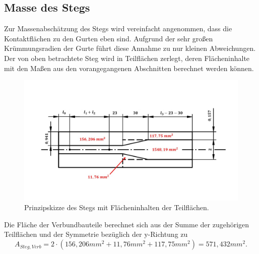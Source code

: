 \subsection{Masse des Stegs}
Zur Massenabschätzung des Stegs wird vereinfacht angenommen, dass die Kontaktflächen zu den Gurten eben sind. Aufgrund der sehr großen Krümmungsradien der Gurte führt diese Annahme zu nur kleinen Abweichungen.  
Der von oben betrachtete Steg wird in Teilflächen zerlegt, deren Flächeninhalte mit den Maßen aus den vorangegangenen Abschnitten berechnet werden können.
\begin{figure}[h]
	\includegraphics[width=1.0\textwidth]{Bilder/Stegflaeche.jpg}
	\caption{Prinzipskizze des Stegs mit Flächeninhalten der Teilflächen.}
	\label{fig: StegFlaeche}
\end{figure}
Die Fläche der Verbundbauteile berechnet sich aus der Summe der zugehörigen Teilflächen und der Symmetrie bezüglich der y-Richtung zu
\begin{equation}
	A_{Steg,Verb}=2\cdot\left(156,206mm^{2}+11,76mm^{2}+117,75mm^{2}\right)
	=571,432mm^{2}.
\end{equation}

